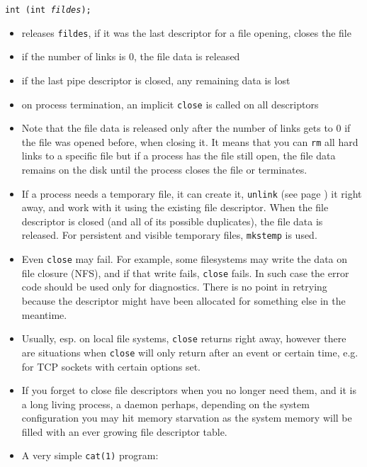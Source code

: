 

\begin{slide}
\texttt{int (int \emph{fildes});}
\begin{itemize}
\item releases \texttt{fildes}, if it was the last descriptor for a file
opening, closes the file
\item if the number of links is 0, the file data is released
\item if the last pipe descriptor is closed, any remaining data is lost
\item on process termination, an implicit \texttt{close} is called on all
descriptors
\end{itemize}
\end{slide}

\begin{itemize}
\item Note that the file data is released only after the number of links gets to
0  if the file was opened before, when closing it.  It means that you
can \texttt{rm} all hard links to a specific file but if a process has the file
still open, the file data remains on the disk until the process closes the file
or terminates.
\item If a process needs a temporary file, it can create it, \texttt{unlink}
(see page \pageref{UNLINK}) it right away, and work with it using the existing
file descriptor.  When the file descriptor is closed (and all of its possible
duplicates), the file data is released. For persistent and visible temporary
files, \texttt{mkstemp} is used.
\item Even \texttt{close} may fail.  For example, some filesystems may write the
data on file closure (NFS), and if that write fails, \texttt{close} fails.
In such case the error code should be used only for diagnostics. There is no
point in retrying because the descriptor might have been allocated for something
else in the meantime.
\item Usually, esp. on local file systems, \texttt{close} returns right away,
however there are situations when \texttt{close} will only return after an
event or certain time, e.g. for TCP sockets with certain options set.
\item If you forget to close file descriptors when you no longer need them,
and it is a long living process, a daemon perhaps, depending on the system
configuration you may hit memory starvation as the system memory will be filled
with an ever growing file descriptor table.
\item {} A very simple \texttt{cat(1)} program:
\end{itemize}

